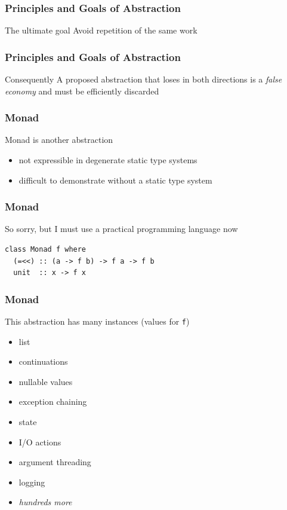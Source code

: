 \begin{frame}
\frametitle{Principles and Goals of Abstraction}
\begin{block}{The ultimate goal}
Avoid repetition of the same work
\end{block}
\end{frame}


\begin{frame}
\frametitle{Principles and Goals of Abstraction}
\begin{block}{Consequently}
A proposed abstraction that loses in both directions is a \emph{false economy} and must be efficiently discarded
\end{block}
\end{frame}


\begin{frame}
\frametitle{Monad}
\begin{block}{Monad is another abstraction}
\begin{itemize}
  \item not expressible in degenerate static type systems
  \item difficult to demonstrate without a static type system
\end{itemize}
\end{block}
\end{frame}


\begin{frame}[fragile]
\frametitle{Monad}
\begin{block}{So sorry, but I must use a practical programming language now}
\begin{lstlisting}[style=haskell,mathescape]
class Monad f where
  (=<<) :: (a -> f b) -> f a -> f b
  unit  :: x -> f x
\end{lstlisting}
\end{block}
\end{frame}


\begin{frame}[fragile]
\frametitle{Monad}
\begin{block}{This abstraction has many instances (values for \lstinline$f$)}
\begin{itemize}
  \item list
  \item continuations
  \item nullable values
  \item exception chaining
  \item state
  \item I/O actions
  \item argument threading
  \item logging
  \item \emph{hundreds more}
\end{itemize}
\end{block}
\end{frame}


